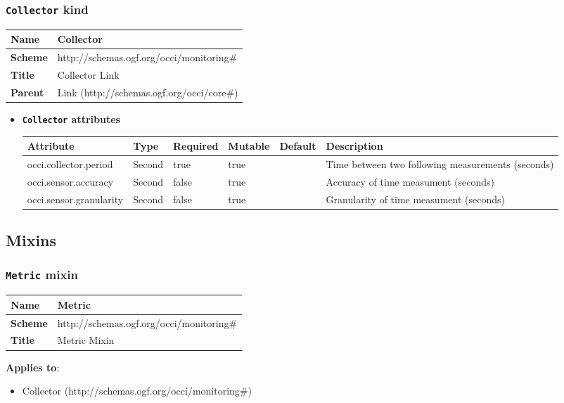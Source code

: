\subsubsection{\texttt{Collector} kind}
\begin{center}
\begin{tabular}{|l|l|}
  \hline
  \textbf{Name} & Collector \\
  \hline  
  \textbf{Scheme} & http://schemas.ogf.org/occi/monitoring\# \\
  \hline
  \textbf{Title} & Collector Link \\
  \hline
  \textbf{Parent} & Link (http://schemas.ogf.org/occi/core\#) \\
  \hline
\end{tabular}
\end{center}
\begin{itemize}
\item \textbf{\texttt{Collector} attributes}

\begin{tabularx}{\textwidth}{|l|l|p{1.4cm}|p{1.3cm}|l|X|}
  \hline
  \textbf{Attribute} & \textbf{Type} & \textbf{Required} & \textbf{Mutable} & \textbf{Default} & \textbf{Description} \\
  \hline  
  occi.collector.period & Second & true & true &  & Time between two following measurements (seconds) \\
  \hline
  occi.sensor.accuracy & Second & false & true &  & Accuracy of time measument (seconds) \\
  \hline
  occi.sensor.granularity & Second & false & true &  & Granularity of time measument (seconds) \\
  \hline
\end{tabularx}
\end{itemize}


\subsection{Mixins}
\subsubsection{\texttt{Metric} mixin}
\begin{center}
\begin{tabular}{|l|l|}
  \hline
  \textbf{Name} & Metric \\
  \hline  
  \textbf{Scheme} & http://schemas.ogf.org/occi/monitoring\# \\
  \hline
  \textbf{Title} & Metric Mixin \\
  \hline
\end{tabular}
\end{center}
\textbf{Applies to}:
\begin{itemize}
	\item Collector (http://schemas.ogf.org/occi/monitoring\#)
\end{itemize}



